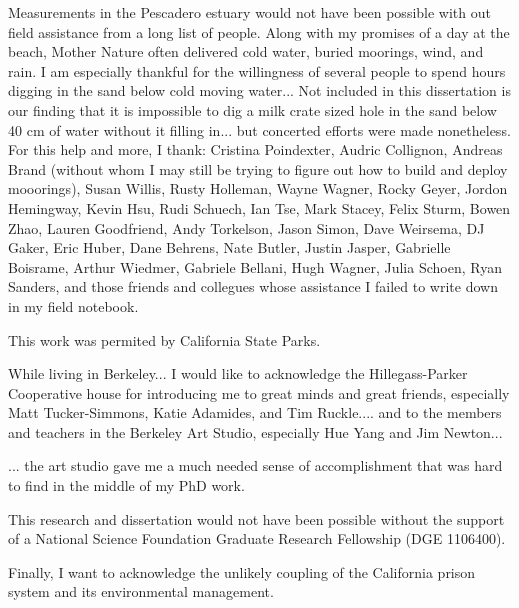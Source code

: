 \documentclass{ucbthesis}
\begin{document}
\begin{frontmatter}
\begin{acknowledgements}
Measurements in the Pescadero estuary would not have been possible with out field assistance from a long list of people. Along with my promises of a day at the beach, Mother Nature often delivered cold water, buried moorings, wind, and rain. I am especially thankful for the willingness of several people to spend hours digging in the sand below cold moving water... Not included in this dissertation is our finding that it is impossible to dig a milk crate sized hole in the sand below 40 cm of water without it filling in... but concerted efforts were made nonetheless.  For this help and more, I thank: Cristina Poindexter, Audric Collignon, Andreas Brand (without whom I may still be trying to figure out how to build and deploy mooorings), Susan Willis, Rusty Holleman, Wayne Wagner, Rocky Geyer, Jordon Hemingway, Kevin Hsu, Rudi Schuech, Ian Tse, Mark Stacey, Felix Sturm, Bowen Zhao, Lauren Goodfriend, Andy Torkelson, Jason Simon, Dave Weirsema, DJ Gaker, Eric Huber, Dane Behrens, Nate Butler, Justin Jasper, Gabrielle Boisrame, Arthur Wiedmer, Gabriele Bellani, Hugh Wagner, Julia Schoen, Ryan Sanders, and those friends and collegues whose assistance I failed to write down in my field notebook. 

This work was permited by California State Parks.

While living in Berkeley... 
I would like to acknowledge the Hillegass-Parker Cooperative house for introducing me to great minds and great friends, especially Matt Tucker-Simmons, Katie Adamides, and Tim Ruckle.... and to the members and teachers in the Berkeley Art Studio, especially Hue Yang and Jim Newton...

... the art studio gave me a much needed sense of accomplishment that was hard to find in the middle of my PhD work. 

This research and dissertation would not have been possible without the support of a National Science Foundation Graduate Research Fellowship (DGE 1106400).

Finally, I want to acknowledge the unlikely coupling of the California prison system and its environmental management.

\end{acknowledgements}

\end{frontmatter}


\pagestyle{headings}  %

%















\printbibliography
\end{document}
